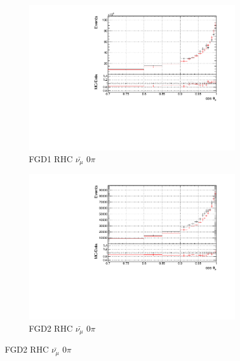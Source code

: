 \begin{figure}[!h]
\begin{subfigure}{0.49\textwidth}
  \centering
  \includegraphics[width=\textwidth]{figs/prioronly1D_t_FGD1_anti-numuCC_0pi}
  \caption{FGD1 RHC $\bar{\nu_{\mu}}$ 0$\pi$}
\end{subfigure}
\begin{subfigure}{0.49\textwidth}
  \centering
  \includegraphics[width=\textwidth]{figs/prioronly1D_t_FGD2_anti-numuCC_0pi}
  \caption{FGD2 RHC $\bar{\nu_{\mu}}$ 0$\pi$}
\end{subfigure}


\end{figure}
